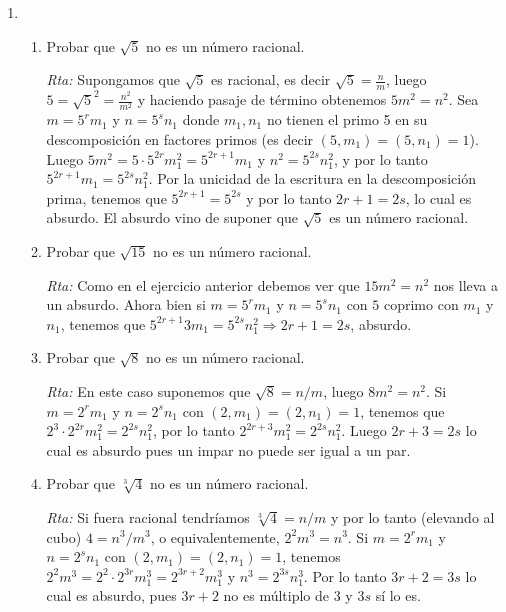 \documentclass[12pt,spanish,makeidx]{amsbook}
\newcommand{\rta}{\noindent\textit{Rta: }}
\begin{document}
\begin{enumerate}
 
 \smallskip
 
 \item 
 \begin{enumerate}
 	\item Probar  que $\sqrt{5}$ no es un número racional. 	
 	
 	\rta Supongamos que  $\sqrt{5}$ es racional, es decir $\sqrt{5} = \displaystyle \frac{n}{m}$, luego $5 =\sqrt{5}^2 =\displaystyle \frac{n^2}{m^2}$ y haciendo pasaje de término obtenemos $5m^2 = n^2$. Sea $m = 5^rm_1$ y $n = 5^sn_1$ donde $m_1,n_1$ no tienen el primo 5 en su descomposición en factores primos (es decir $(5,m_1) = (5,n_1) = 1$). Luego $5m^2 = 5 \cdot 5^{2r}m_1^2= 5^{2r+1}m_1$ y $n^2 = 5^{2s}n_1^2$, y por lo tanto $5^{2r+1}m_1 =   5^{2s}n_1^2$. Por la unicidad de la escritura en la descomposición prima,  tenemos que  $5^{2r+1}= 5^{2s}$ y por lo tanto  ${2r+1}= {2s}$, lo cual es absurdo. El absurdo vino de suponer que   $\sqrt{5}$ es un número racional.
 	\item Probar  que $\sqrt{15}$ no es un número racional.  	
 	
 	\rta Como en el ejercicio anterior debemos ver que $15m^2 = n^2$ nos lleva a un absurdo. Ahora bien si $m = 5^rm_1$ y $n = 5^sn_1$ con $5$ coprimo con $m_1$ y $n_1$, tenemos que  $5^{2r+1}3m_1 =   5^{2s}n_1^2 \Rightarrow 2r+1 = 2s$, absurdo.
 	\item Probar  que $\sqrt{8}$ no es un número racional. 	
 	
 	\rta En  este caso  suponemos que $\sqrt{8} =n/m$, luego $ 8m^2 = n^2$. Si $m = 2^rm_1$ y $n = 2^sn_1$ con $(2,m_1) = (2,n_1) = 1$, tenemos  que $2^3 \cdot 2^{2r} m_1^2 = 2^{2s}n_1^2$, por lo tanto $2^{2r+3} m_1^2 = 2^{2s}n_1^2$. Luego $2r+3 = 2s$ lo cual es absurdo pues un impar no puede ser igual a un par.  
 	\item Probar  que $\sqrt[3]{4}$ no es un número racional. 	
 	
 	\rta Si fuera racional tendríamos $\sqrt[3]{4} = n/m$ y  por lo tanto (elevando al cubo) $4 =n^3/m^3$, o equivalentemente,   $2^2m^3 = n^3$. Si $m = 2^rm_1$ y $n = 2^sn_1$ con $(2,m_1) = (2,n_1) = 1$, tenemos  $2^2m^3 = 2^2\cdot 2^{3r}m_1^3 =2^{3r+2}m_1^3$ y  	$n^3 =2^{3s}n_1^3 $. Por  lo tanto  $3r+2 = 3s$ lo cual es absurdo, pues $3r+2$ no es múltiplo de 3 y $3s$ sí lo es.
 \end{enumerate}
\smallskip



\end{enumerate}
\end{document}
